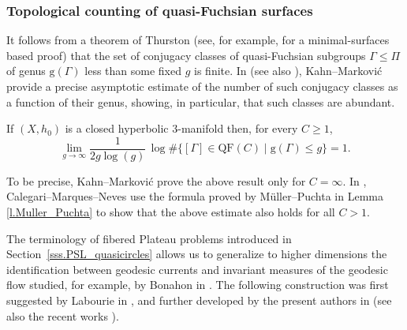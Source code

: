 \subsubsection{Topological counting of quasi-Fuchsian surfaces} It follows from a theorem of Thurston (see, for example, \cite[Th.\,4.5]{LabourieBourbaki} for a minimal-surfaces based proof) that the set of conjugacy classes of quasi-Fuchsian subgroups $\Gamma\leq\Pi$ of genus $\text{g}(\Gamma)$ less than some fixed $g$ is finite. In \cite{KM2} (see also \cite{CMN}), Kahn--Markovi\'c provide a precise asymptotic estimate of the number of such conjugacy classes as a function of their genus, showing, in particular, that such classes are abundant.

\begin{theorem}\label{th.KM2}
If $(X,h_0)$ is a closed hyperbolic $3$\nobreakdash-manifold then, for every $C\geq 1$,
\begin{equation}\label{eq.topo_counting}\lim_{g\to\infty}\frac{1}{2g\log(g)}\,\log\#\{[\Gamma]\in\mathrm{QF}(C)\mid\mathrm{g}(\Gamma)\leq g\}=1.
\end{equation}
\end{theorem}

\begin{remark}To be precise, Kahn--Markovi\'c prove the above result only for $C=\infty$. In \cite[Th.\,4.2.]{CMN}, Calegari--Marques--Neves use the formula proved by Müller--Puchta in Lemma \ref{l.Muller_Puchta} to show that the above estimate also holds for all $C>1$.
\end{remark}


\label{sss.conf_currents_PSL_inv_laminar_measures} The terminology of fibered Plateau problems introduced in Section~\ref{sss.PSL_quasicircles} allows us to generalize to higher dimensions the identification between geodesic currents and invariant measures of the geodesic flow studied, for example, by Bonahon in \cite{Bonahon_laminations}. The following construction was first suggested by Labourie in \cite{LabourieBourbaki}, and further developed by the present authors in \cite{ALS} (see also the recent works \cite{Brody_Reyes,MN_currents}).

